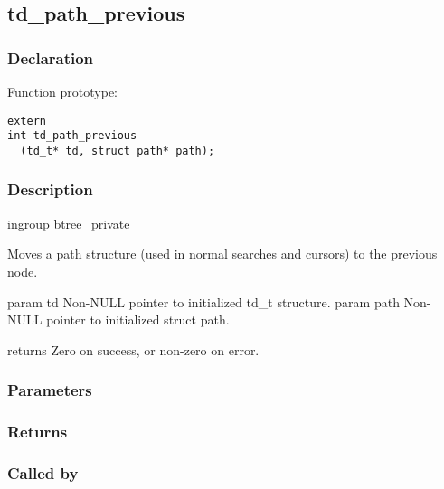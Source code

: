 
\newpage
\subsection{td\_path\_previous}
\subsubsection{Declaration} Function prototype:

\begin{verbatim}
extern
int td_path_previous
  (td_t* td, struct path* path);
\end{verbatim}

\subsubsection{Description}


 ingroup btree\_private

 Moves a path structure (used in normal searches and cursors)
 to the previous node.

 param td Non-NULL pointer to initialized td\_t structure.
 param path Non-NULL pointer to initialized struct path.

 returns Zero on success, or non-zero on error.
 

\subsubsection{Parameters}
\subsubsection{Returns}
\subsubsection{Called by}
